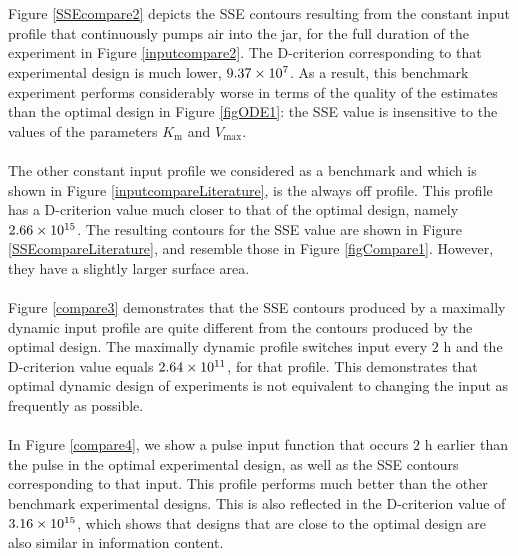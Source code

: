 \\
\\
Figure \ref{SSEcompare2} depicts the SSE contours resulting from the constant input profile that continuously pumps air into the jar, for the full duration of the experiment in Figure \ref{inputcompare2}. The D-criterion corresponding to that experimental design is much lower, $9.37\times 10^{7}$. As a result, this benchmark experiment performs considerably worse in terms of the quality of the estimates than the optimal design in Figure \ref{figODE1}: the SSE value is insensitive to the values of the parameters $K_\text{m}$ and $V_{\text{max}}$.
\\
\\
The other constant input profile we considered as a benchmark and which is shown in Figure \ref{inputcompareLiterature}, is the always off profile. This profile has a D-criterion value much closer to that of the optimal design, namely $2.66\times 10^{15}$. The resulting contours for the SSE value are shown in Figure \ref{SSEcompareLiterature}, and resemble those in Figure \ref{figCompare1}. However, they have a slightly larger surface area.
\\
\\
Figure \ref{compare3} demonstrates that the SSE contours produced by a maximally dynamic input profile are quite different from the contours produced by the optimal design. The maximally dynamic profile switches input every $2 \text{ h}$ and the D-criterion value equals $2.64\times 10^{11}$, for that profile. This demonstrates that optimal dynamic design of experiments is not equivalent to changing the input as frequently as possible.
\\
\\
In Figure \ref{compare4}, we show a pulse input function that occurs $2 \text{ h}$ earlier than the pulse in the optimal experimental design, as well as the SSE contours corresponding to that input. This profile performs much better than the other benchmark experimental designs. This is also reflected in the D-criterion value of $3.16\times 10^{15}$, which shows that designs that are close to the optimal design are also similar in information content.
